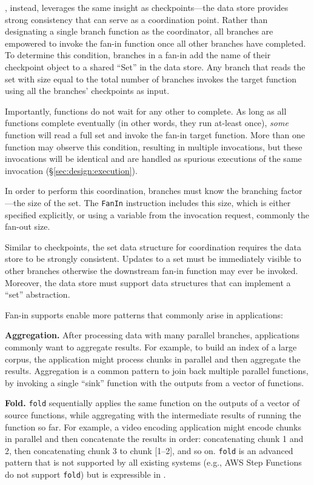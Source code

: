 \name{}, instead, leverages the same insight as checkpoints---the data store
provides strong consistency that can serve as a coordination point. Rather
than designating a single branch function as the coordinator, all branches are
empowered to invoke the fan-in function once all other branches have
completed. To determine this condition, branches in a fan-in add the name of
their checkpoint object to a shared ``Set'' in the data store. Any branch that
reads the set with size equal to the total number of branches invokes the
target function using all the branches' checkpoints as input.

Importantly, functions do not wait for any other to complete. As long as all
functions complete eventually (in other words, they run at-least once),
\emph{some} function will read a full set and invoke the fan-in target
function. More than one function may observe this condition, resulting in
multiple invocations, but these invocations will be identical and are handled
as spurious executions of the same invocation (\S\ref{sec:design:execution}).

In order to perform this coordination, branches must know the branching
factor---the size of the set. The \texttt{FanIn} instruction includes this
size, which is either specified explicitly, or using a variable from the
invocation request, commonly the fan-out size.

Similar to checkpoints, the set data structure for coordination requires the
data store to be strongly consistent. Updates to a set must be immediately
visible to other branches otherwise the downstream fan-in function may ever be
invoked. Moreover, the data store must support data structures that can
implement a ``set'' abstraction.

Fan-in supports enable more patterns that commonly arise in applications:

\textbf{Aggregation.} After processing data with many parallel branches,
applications commonly want to aggregate results. For example, to build an
index of a large corpus, the application might process chunks in parallel and
then aggregate the results. Aggregation is a common pattern to join back
multiple parallel functions, by invoking a single ``sink'' function with the
outputs from a vector of functions.

\textbf{Fold.} \texttt{fold} sequentially applies the same function on the
outputs of a vector of source functions, while aggregating with the
intermediate results of running the function so far. For example, a video
encoding application might encode chunks in parallel and then concatenate the
results in order: concatenating chunk 1 and 2, then concatenating chunk 3 to
chunk [1--2], and so on. \texttt{fold} is an advanced pattern that is not
supported by all existing systems (e.g., AWS Step Functions do not support
\texttt{fold}) but is expressible in \name{}.



